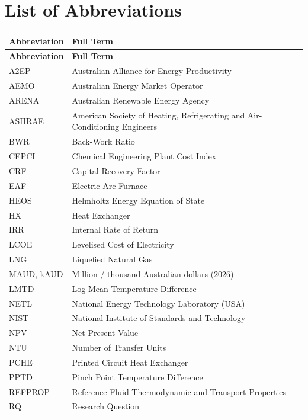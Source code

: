 \documentclass[12pt,a4paper]{report}
\begin{document}
\chapter*{List of Abbreviations}

\begin{longtable}{p{3.2cm} p{10.5cm}}
\toprule
\textbf{Abbreviation} & \textbf{Full Term} \\
\midrule
\endfirsthead
\toprule
\textbf{Abbreviation} & \textbf{Full Term} \\
\midrule
\endhead
\bottomrule
\endlastfoot
A2EP    & Australian Alliance for Energy Productivity \\
AEMO    & Australian Energy Market Operator \\
ARENA   & Australian Renewable Energy Agency \\
ASHRAE  & American Society of Heating, Refrigerating and Air-Conditioning Engineers \\
BWR     & Back-Work Ratio \\
CEPCI   & Chemical Engineering Plant Cost Index \\
CRF     & Capital Recovery Factor \\
EAF     & Electric Arc Furnace \\
HEOS    & Helmholtz Energy Equation of State \\
HX      & Heat Exchanger \\
IRR     & Internal Rate of Return \\
LCOE    & Levelised Cost of Electricity \\
LNG     & Liquefied Natural Gas \\
MAUD, kAUD & Million / thousand Australian dollars (2026) \\
LMTD    & Log-Mean Temperature Difference \\
NETL    & National Energy Technology Laboratory (USA) \\
NIST    & National Institute of Standards and Technology \\
NPV     & Net Present Value \\
NTU     & Number of Transfer Units \\
PCHE    & Printed Circuit Heat Exchanger \\
PPTD    & Pinch Point Temperature Difference \\
REFPROP & Reference Fluid Thermodynamic and Transport Properties \\
RQ      & Research Question \\

\end{longtable}
\end{document}
